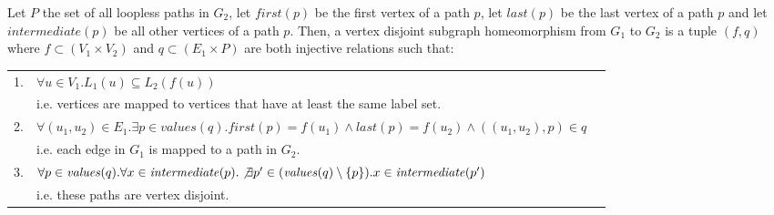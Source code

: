 \begin{defn}
Let $P$ the set of all loopless paths in $G_2$, let $first(p)$ be the first vertex of a path $p$, let $last(p)$ be the last vertex of a path $p$ and let $intermediate(p)$ be all other vertices of a path $p$. Then, a vertex disjoint subgraph homeomorphism from $G_1$ to $G_2$ is a tuple $(f, q)$ where $f\subset (V_1 \times V_2)$ and $q \subset (E_1 \times P)$ are both injective relations such that:

\begin{tabular}{rlr}
 1. & $\forall u \in V_1 . L_1(u)\subseteq L_2(f(u))$&\\
 
 &i.e. vertices are mapped to vertices that have at least the same label set.&\\
 
 2. & $\forall (u_1, u_2) \in E_1 . \exists p \in \mathit{values}(q). \mathit{first}(p)=f(u_1) \land \mathit{last}(p)=f(u_2) \land ((u_1, u_2), p) \in q$&\\
 &i.e. each edge in $G_1$ is mapped to a path in $G_2$.&\\
 
 3. & $\forall p \in \mathit{values}(q) . \forall x \in \mathit{intermediate}(p) . \not \exists p' \in (\mathit{values}(q) \setminus \{p\}) . x \in \mathit{intermediate}(p')$&\\
    &i.e. these paths are vertex disjoint.&\\
\end{tabular}

\label{def:pathsubgraphisomorphism}
\end{defn}


